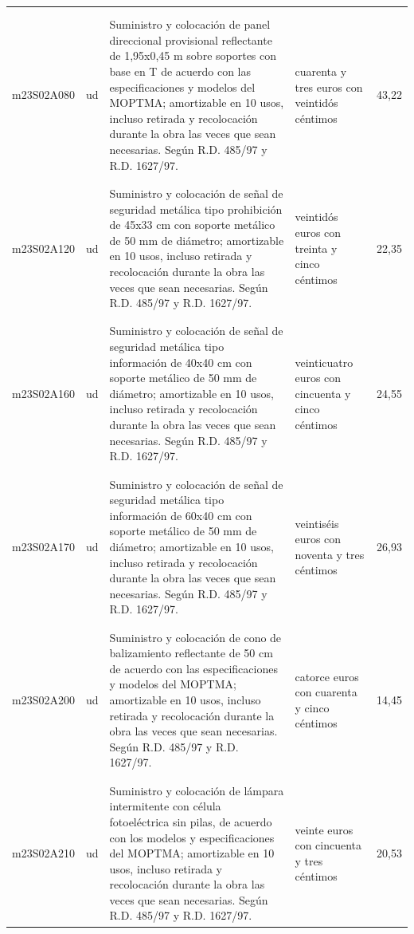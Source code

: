 \documentclass{book}%
\begin{document}
\begin{supertabular}{|l|l|p{5cm}|p{3cm}|r|}
&&&&\\%
&&&&\\%
m23S02A080&ud&Suministro y colocación de panel direccional provisional reflectante de 1,95x0,45 m sobre soportes con base en T de acuerdo con las especificaciones y modelos del MOPTMA; amortizable en 10 usos, incluso retirada y recolocación durante la obra las veces que sean necesarias. Según R.D. 485/97 y R.D. 1627/97.&cuarenta y tres euros con veintidós céntimos&43,22\\%
&&&&\\%
&&&&\\%
m23S02A120&ud&Suministro y colocación de señal de seguridad metálica tipo prohibición de 45x33 cm con soporte metálico de 50 mm de diámetro; amortizable en 10 usos, incluso retirada y recolocación durante la obra las veces que sean necesarias. Según R.D. 485/97 y R.D. 1627/97.&veintidós euros con treinta y cinco céntimos&22,35\\%
&&&&\\%
&&&&\\%
m23S02A160&ud&Suministro y colocación de señal de seguridad metálica tipo información de 40x40 cm con soporte metálico de 50 mm de diámetro; amortizable en 10 usos, incluso retirada y recolocación durante la obra las veces que sean necesarias. Según R.D. 485/97 y R.D. 1627/97.&veinticuatro euros con cincuenta y cinco céntimos&24,55\\%
&&&&\\%
&&&&\\%
m23S02A170&ud&Suministro y colocación de señal de seguridad metálica tipo información de 60x40 cm con soporte metálico de 50 mm de diámetro; amortizable en 10 usos, incluso retirada y recolocación durante la obra las veces que sean necesarias. Según R.D. 485/97 y R.D. 1627/97.&veintiséis euros con noventa y tres céntimos&26,93\\%
&&&&\\%
&&&&\\%
m23S02A200&ud&Suministro y colocación de cono de balizamiento reflectante de 50 cm de acuerdo con las especificaciones y modelos del MOPTMA; amortizable en 10 usos, incluso retirada y recolocación durante la obra las veces que sean necesarias. Según R.D. 485/97 y R.D. 1627/97.&catorce euros con cuarenta y cinco céntimos&14,45\\%
&&&&\\%
&&&&\\%
m23S02A210&ud&Suministro y colocación de lámpara intermitente con célula fotoeléctrica sin pilas, de acuerdo con los modelos y especificaciones del MOPTMA; amortizable en 10 usos, incluso retirada y recolocación durante la obra las veces que sean necesarias. Según R.D. 485/97 y R.D. 1627/97.&veinte euros con cincuenta y tres céntimos&20,53\\%

\end{supertabular}
\end{document}

